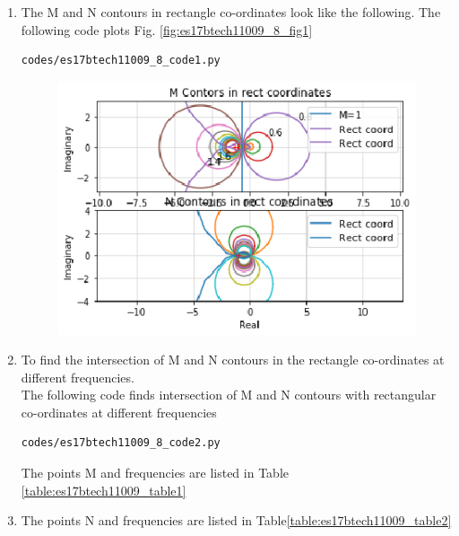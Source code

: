 \begin{enumerate}[label=\thesection.\arabic*.,ref=\thesection.\theenumi]
\item
The M and N contours in rectangle co-ordinates look like the following.
The following code plots Fig. \ref{fig:es17btech11009_8_fig1}
\begin{lstlisting}
codes/es17btech11009_8_code1.py
\end{lstlisting}

\begin{figure}[!h]
\includegraphics[width=\columnwidth]{./figs/es17btech11009_8_fig1.eps}
\caption{}
\label{fig:es17btech11009_8_1}
\end{figure}

\item
To find the intersection of M and N contours in the rectangle co-ordinates at different frequencies. \\
\solution 
The following code finds intersection of M and N contours with rectangular co-ordinates at different frequencies
\begin{lstlisting}
codes/es17btech11009_8_code2.py
\end{lstlisting}

The points M and frequencies are listed in Table  \ref{table:es17btech11009_table1}
\begin{table}[!ht]
\centering

\caption{}
\label{table:es17btech11009_table1}
\end{table}

\item
The points N and frequencies are listed in Table\ref{table:es17btech11009_table2}
\begin{table}[!ht]
\centering

\caption{}
\label{table:es17btech11009_table2}
\end{table}


\end{enumerate}
